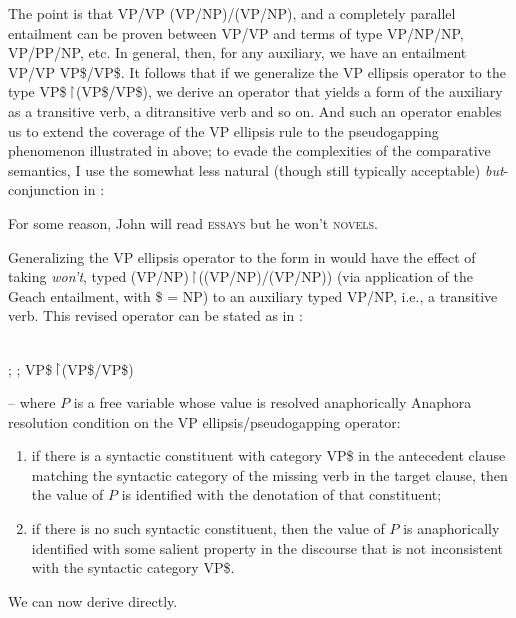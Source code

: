 \documentclass[output=paper,colorlinks,citecolor=brown]{langscibook}
\begin{document}
The point is that VP/VP \sem{  \ensuremath{\vdash\xspace } } (VP/NP)/(VP/NP), and  a completely parallel
entailment can be proven between VP/VP and terms of type VP/NP/NP,
VP/PP/NP, etc. In general, then, for any auxiliary, we have an entailment
VP/VP\sem{  \ensuremath{\:\vdash\xspace } \, } VP\$/VP\$. It follows that if we generalize the VP ellipsis
operator to the type VP\$\ensuremath{\vs}(VP\$/VP\$), we derive an
operator that yields a form of the auxiliary as a transitive verb, a
ditransitive verb and so on. And such an operator enables us to extend the coverage of
the VP ellipsis rule to the pseudogapping phenomenon illustrated in
 above; to evade the complexities of the comparative
semantics, I use the somewhat less natural (though still typically
acceptable) \textit{but}-conjunction in :

\begin{exe}
 \ex\label{conjPseudo}
  For some reason, John will read \textsc{essays} but he won't \textsc{novels}.
\end{exe}
Generalizing the VP ellipsis operator to the form in 
would have the effect of taking \textit{won't}, typed
(VP/NP)\ensuremath{\vs}((VP/NP)/(VP/NP)) (via application of the Geach entailment, with \$ = NP) to an
auxiliary typed VP/NP, i.e., a transitive verb. This revised operator
can be stated as in :

\begin{exe}
 \ex\label{generalized}
   \\
  ; ; VP\$\ensuremath{\vs}(VP\$/VP\$)

   -- where $P$ is a free variable whose value is
  resolved anaphorically
 \ex
  Anaphora resolution condition on the VP ellipsis/pseudogapping
  operator:
  \begin{enumerate}
   \item
    if there is a syntactic  constituent
    with category VP\$ in the antecedent clause matching the
    syntactic  category of the missing verb in the target clause,
    then the value of $P$ is identified with the denotation of that constituent;
   \item
    if there is no such syntactic  constituent, then the value of $P$  is anaphorically
    identified with some salient property in the discourse that is not
    inconsistent with the syntactic  category VP\$.
  \end{enumerate}
\end{exe}
We can now derive  directly.
\end{document}
